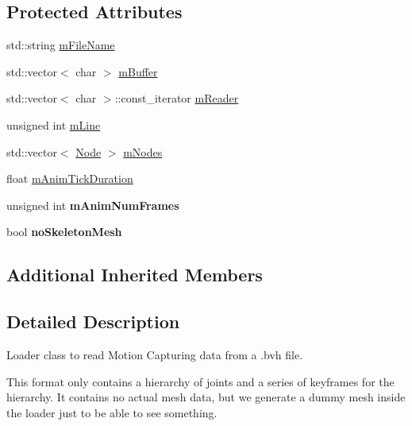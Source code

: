 \subsection*{Protected Attributes}
\begin{DoxyCompactItemize}
\item 
std\+::string \hyperlink{class_assimp_1_1_b_v_h_loader_a034214fb7761d7940b64caf8b569b4a3}{m\+File\+Name}
\item 
std\+::vector$<$ char $>$ \hyperlink{class_assimp_1_1_b_v_h_loader_a63b77fea8384ccd978416a40eb2cf242}{m\+Buffer}
\item 
std\+::vector$<$ char $>$\+::const\+\_\+iterator \hyperlink{class_assimp_1_1_b_v_h_loader_ad7afa3ab368969bfd40f033456599713}{m\+Reader}
\item 
unsigned int \hyperlink{class_assimp_1_1_b_v_h_loader_a3d51f5982c16a51785ec38ab4cd64dd3}{m\+Line}
\item 
std\+::vector$<$ \hyperlink{struct_node}{Node} $>$ \hyperlink{class_assimp_1_1_b_v_h_loader_aece4b9ced38cd7ca8151dcd6ee7fc65a}{m\+Nodes}
\item 
float \hyperlink{class_assimp_1_1_b_v_h_loader_ad3515f43c7caa917c2b1b35d80da1565}{m\+Anim\+Tick\+Duration}
\item 
\hypertarget{class_assimp_1_1_b_v_h_loader_aea196453d9f25ed32f3291df63bc96bc}{unsigned int {\bfseries m\+Anim\+Num\+Frames}}\label{class_assimp_1_1_b_v_h_loader_aea196453d9f25ed32f3291df63bc96bc}

\item 
\hypertarget{class_assimp_1_1_b_v_h_loader_a736c0d851ff9eb1bb6acbc187f156be4}{bool {\bfseries no\+Skeleton\+Mesh}}\label{class_assimp_1_1_b_v_h_loader_a736c0d851ff9eb1bb6acbc187f156be4}

\end{DoxyCompactItemize}
\subsection*{Additional Inherited Members}


\subsection{Detailed Description}
Loader class to read Motion Capturing data from a .bvh file.

This format only contains a hierarchy of joints and a series of keyframes for the hierarchy. It contains no actual mesh data, but we generate a dummy mesh inside the loader just to be able to see something. 

